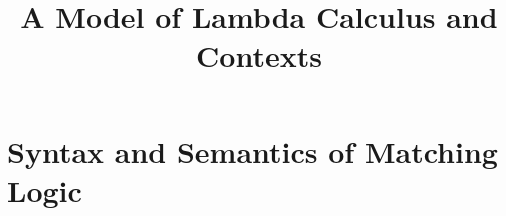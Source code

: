 \documentclass[acmsmall]{acmart}
\title{A Model of Lambda Calculus and Contexts}
\begin{document}
\maketitle

\section{Syntax and Semantics of Matching Logic}
\end{document}
